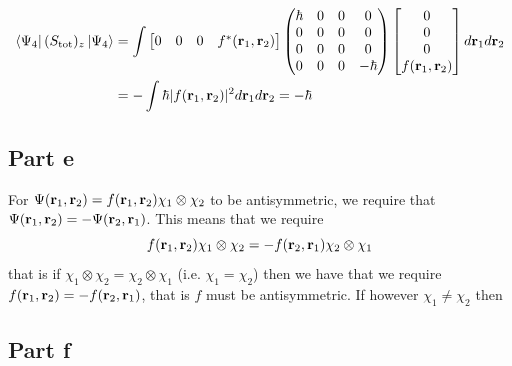 \documentclass[12pt]{report}
\theoremstyle{custom}
\newcommand{\rb}{\bold{r}}
\begin{document}
  \begin{align*}
    \bra{\Psi_4}(S_{\text{tot}})_z \ket{\Psi_4} &= \int \begin{bmatrix} 0 & 0 & 0 & f^*(\rb_1,\rb_2) \end{bmatrix}  \begin{pmatrix} \hbar & 0 & 0 & 0 \\ 0 & 0 & 0 & 0 \\ 0 & 0 & 0 & 0 \\ 0 & 0 & 0 & -\hbar \end{pmatrix}  \begin{bmatrix} 0 \\ 0 \\ 0 \\ f(\rb_1,\rb_2) \end{bmatrix} d\rb_1 d\rb_2 \\
                                              &=  -\int \hbar |f(\rb_1,\rb_2)|^2 d\rb_1 d\rb_2 = -\hbar
  \end{align*}

\subsection*{Part e}
For $\Psi(\rb_1,\rb_2) = f(\rb_1,\rb_2) \chi_1 \otimes \chi_2$ to be antisymmetric, we require that $\Psi(\rb_1,\rb_2) = - \Psi(\rb_2,\rb_1)$. This means that we require
\begin{equation*}
f(\rb_1,\rb_2) \chi_1 \otimes \chi_2 = -f(\rb_2,\rb_1) \chi_2 \otimes \chi_1
\end{equation*}
that is if $\chi_1 \otimes \chi_2 = \chi_2 \otimes \chi_1$ (i.e. $\chi_1 = \chi_2$) then we have that we require $f(\rb_1, \rb_2) = -f(\rb_2,\rb_1)$, that is $f$ must be antisymmetric. If however $\chi_1 \neq \chi_2$ then 

\subsection*{Part f}
\end{document}
